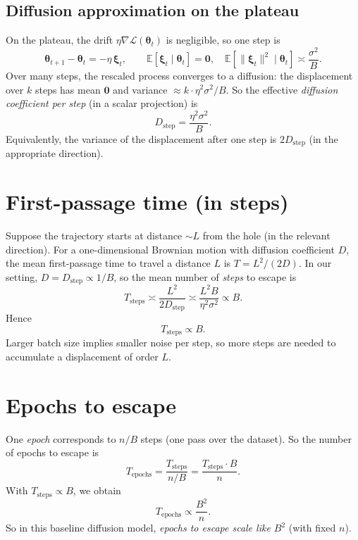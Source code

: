 \documentclass[11pt]{article}
\newcommand{\E}{\mathbb{E}}
\newcommand{\calL}{\mathcal{L}}
\newcommand{\btheta}{\bm{\theta}}
\newcommand{\bxi}{\bm{\xi}}
\newcommand{\bzero}{\bm{0}}
\begin{document}
\subsection{Diffusion approximation on the plateau}

On the plateau, the drift $\eta \nabla \calL(\btheta_t)$ is negligible, so one step is
\begin{equation}
\btheta_{t+1} - \btheta_t = -\eta \, \bxi_t, \qquad \E[\bxi_t \mid \btheta_t] = \bzero, \quad \E[\|\bxi_t\|^2 \mid \btheta_t] \asymp \frac{\sigma^2}{B}.
\end{equation}
Over many steps, the rescaled process converges to a diffusion: the displacement over $k$ steps has mean $\bzero$ and variance $\approx k \cdot \eta^2 \sigma^2 / B$. So the effective \emph{diffusion coefficient per step} (in a scalar projection) is
\begin{equation}
D_{\mathrm{step}} = \frac{\eta^2 \sigma^2}{B}.
\end{equation}
Equivalently, the variance of the displacement after one step is $2 D_{\mathrm{step}}$ (in the appropriate direction).

\section{First-passage time (in steps)}

Suppose the trajectory starts at distance $\sim L$ from the hole (in the relevant direction). For a one-dimensional Brownian motion with diffusion coefficient $D$, the mean first-passage time to travel a distance $L$ is $T = L^2 / (2D)$. In our setting, $D = D_{\mathrm{step}} \propto 1/B$, so the mean number of \emph{steps} to escape is
\begin{equation}
T_{\mathrm{steps}} \asymp \frac{L^2}{2 D_{\mathrm{step}}} \asymp \frac{L^2 B}{\eta^2 \sigma^2} \propto B.
\end{equation}
Hence
\begin{equation}
\boxed{\; T_{\mathrm{steps}} \propto B. \;}
\end{equation}
Larger batch size implies smaller noise per step, so more steps are needed to accumulate a displacement of order $L$.

\section{Epochs to escape}

One \emph{epoch} corresponds to $n/B$ steps (one pass over the dataset). So the number of epochs to escape is
\begin{equation}
T_{\mathrm{epochs}} = \frac{T_{\mathrm{steps}}}{n/B} = \frac{T_{\mathrm{steps}} \cdot B}{n}.
\end{equation}
With $T_{\mathrm{steps}} \propto B$, we obtain
\begin{equation}
\boxed{\; T_{\mathrm{epochs}} \propto \frac{B^2}{n}. \;}
\end{equation}
So in this baseline diffusion model, \emph{epochs to escape scale like $B^2$} (with fixed $n$).
\end{document}
